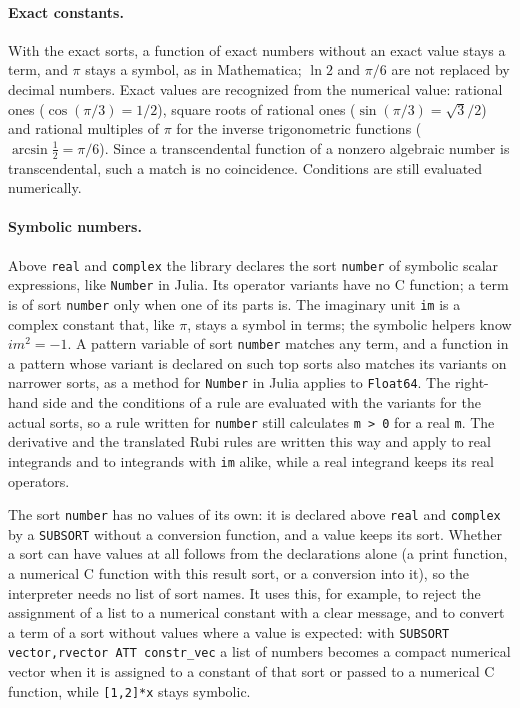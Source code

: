 \documentclass[11pt,a4paper]{article}
\begin{document}
\paragraph{Exact constants.} With the exact sorts, a function of exact
numbers without an exact value stays a term, and $\pi$ stays a symbol, as
in Mathematica; $\ln 2$ and $\pi/6$ are not replaced by decimal numbers.
Exact values are recognized from the numerical value: rational ones
($\cos(\pi/3)=1/2$), square roots of rational ones
($\sin(\pi/3)=\sqrt3/2$) and rational multiples of $\pi$ for the inverse
trigonometric functions ($\arcsin\frac12=\pi/6$). Since a transcendental
function of a nonzero algebraic number is transcendental, such a match is
no coincidence. Conditions are still evaluated numerically.

\paragraph{Symbolic numbers.} Above \texttt{real} and \texttt{complex}
the library declares the sort \texttt{number} of symbolic scalar
expressions, like \texttt{Number} in Julia. Its operator variants have no
C function; a term is of sort \texttt{number} only when one of its parts
is. The imaginary unit \texttt{im} is a complex constant that, like
$\pi$, stays a symbol in terms; the symbolic helpers know
$\mathit{im}^2=-1$. A
pattern variable of sort \texttt{number} matches any term, and a function in
a pattern whose variant is declared on such top sorts also matches its
variants on narrower sorts, as a method for \texttt{Number} in Julia
applies to \texttt{Float64}. The right-hand side and the conditions of a
rule are evaluated with the variants for the actual sorts, so a rule
written for \texttt{number} still calculates \texttt{m > 0} for a real
\texttt{m}. The derivative and the translated Rubi rules are written this
way and apply to real integrands and to integrands with \texttt{im}
alike, while a real integrand keeps its real operators.

The sort \texttt{number} has no values of its own: it is declared above
\texttt{real} and \texttt{complex} by a \texttt{SUBSORT} without a
conversion function, and a value keeps its sort. Whether a sort can have
values at all follows from the declarations alone (a print function, a
numerical C function with this result sort, or a conversion into it), so
the interpreter needs no list of sort names. It uses this, for example, to
reject the assignment of a list to a numerical constant with a clear
message, and to convert a term of a sort without values where a value is
expected: with \texttt{SUBSORT vector,rvector ATT constr\_vec} a list of
numbers becomes a compact numerical vector when it is assigned to a
constant of that sort or passed to a numerical C function, while
\texttt{[1,2]*x} stays symbolic.
\end{document}
